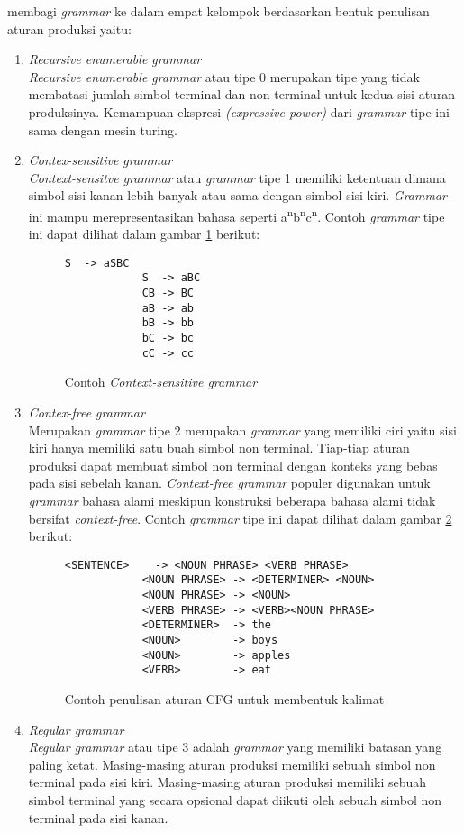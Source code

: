 \citet{bar_feigenbaum} membagi \emph{grammar} ke dalam empat kelompok berdasarkan bentuk penulisan aturan produksi yaitu:
\begin{enumerate}
	\item \emph{Recursive enumerable grammar}\\
	\emph{Recursive enumerable grammar} atau tipe 0 merupakan tipe yang tidak membatasi jumlah simbol terminal dan non terminal untuk kedua sisi aturan produksinya. Kemampuan ekspresi \emph{(expressive power)} dari \emph{grammar} tipe ini sama dengan mesin turing.
	\item \emph{Contex-sensitive grammar}\\
	\emph{Context-sensitve grammar} atau \emph{grammar} tipe 1 memiliki ketentuan dimana simbol sisi kanan lebih banyak atau sama dengan simbol sisi kiri. \emph{Grammar} ini mampu merepresentasikan bahasa seperti a\textsuperscript{n}b\textsuperscript{n}c\textsuperscript{n}. Contoh \emph{grammar} tipe ini dapat dilihat dalam gambar \ref{fig:contoh_csg} berikut:
	\begin{figure}[ht]
		\centering
		\captionsetup{width=0.85\textwidth}
		\begin{lstlisting}[xleftmargin=30pt]
			S  -> aSBC
			S  -> aBC
			CB -> BC
			aB -> ab
			bB -> bb
			bC -> bc
			cC -> cc\end{lstlisting}
		\caption{Contoh \emph{Context-sensitive grammar} \citep{bar_feigenbaum}}
		\label{fig:contoh_csg}
	\end{figure}

	\item \emph{Contex-free grammar}\\
	Merupakan \emph{grammar} tipe 2 merupakan \emph{grammar} yang memiliki ciri yaitu sisi kiri hanya memiliki satu buah simbol non terminal. Tiap-tiap aturan produksi dapat membuat simbol non terminal dengan konteks yang bebas pada sisi sebelah kanan. \emph{Context-free grammar} populer digunakan untuk \emph{grammar} bahasa alami meskipun konstruksi beberapa bahasa alami tidak bersifat \emph{context-free}. Contoh \emph{grammar} tipe ini dapat dilihat dalam gambar \ref{fig:contoh_cfg} berikut:
	\begin{figure}[hb]
		\centering
		\captionsetup{width=0.85\textwidth}
		\begin{lstlisting}[xleftmargin=30pt]
			<SENTENCE>    -> <NOUN PHRASE> <VERB PHRASE>
			<NOUN PHRASE> -> <DETERMINER> <NOUN>
			<NOUN PHRASE> -> <NOUN>
			<VERB PHRASE> -> <VERB><NOUN PHRASE>
			<DETERMINER>  -> the
			<NOUN> 		  -> boys
			<NOUN>		  -> apples
			<VERB>		  -> eat\end{lstlisting}
		\caption{Contoh penulisan aturan CFG untuk membentuk kalimat \citep{bar_feigenbaum}}
		\label{fig:contoh_cfg}
	\end{figure}


	\item \emph{Regular grammar}\\
	\emph{Regular grammar} atau tipe 3 adalah \emph{grammar} yang memiliki batasan yang paling ketat. Masing-masing aturan produksi memiliki sebuah simbol non terminal pada sisi kiri. Masing-masing aturan produksi memiliki sebuah simbol terminal yang secara opsional dapat diikuti oleh sebuah simbol non terminal pada sisi kanan.
\end{enumerate}
